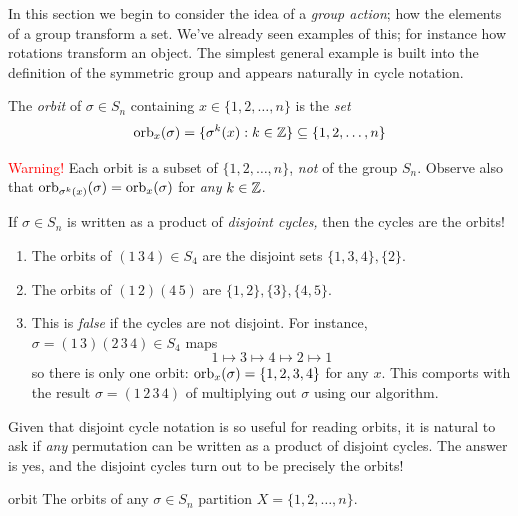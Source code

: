 In this section we begin to consider the idea of a \emph{group action}; how the elements of a group transform a set. We've already seen examples of this; for instance how rotations transform an object. The simplest general example is built into the definition of the symmetric group and appears naturally in cycle notation.

\begin{defn}{}{}
The \emph{orbit} of $\sigma\in S_n$ containing $x\in\{1,2,\ldots,n\}$ is the \emph{set}
\[\mathrm{orb}_x(\sigma)=\{\sigma^k(x):k\in\mathbb{Z}\}\subseteq\{1,2,\ldots,n\}\]
\end{defn}

\textcolor{red}{Warning!} Each orbit is a subset of $\{1,2,\ldots,n\}$, \emph{not} of the group $S_n$.\smallbreak
Observe also that $\mathrm{orb}_{\sigma^k(x)}(\sigma)=\mathrm{orb}_x(\sigma)$ for \emph{any} $k\in\mathbb{Z}$.


\begin{examples}{}{}
If $\sigma\in S_n$ is written as a product of \emph{disjoint cycles,} then the cycles are the orbits!
\begin{enumerate}
  \item The orbits of $(1\,3\,4)\in S_4$ are the disjoint sets $\{1,3,4\},\{2\}$.
  \item The orbits of $(1\,2)(4\,5)$ are $\{1,2\},\{3\},\{4,5\}$.
  \item This is \emph{false} if the cycles are not disjoint. For instance, $\sigma=(1\,3)(2\,3\,4)\in S_4$ maps
	\[1\mapsto 3\mapsto 4\mapsto 2\mapsto 1\]
	so there is only one orbit: $\mathrm{orb}_x(\sigma)=\{1,2,3,4\}$ for any $x$. This comports with the result $\sigma=(1\,2\,3\,4)$ of multiplying out $\sigma$ using our algorithm.
\end{enumerate}
\end{examples}

Given that disjoint cycle notation is so useful for reading orbits, it is natural to ask if \emph{any} permutation can be written as a product of disjoint cycles. The answer is yes, and  the disjoint cycles turn out to be precisely the orbits!


\begin{thm}{}{orbit}
The orbits of any $\sigma\in S_n$ partition $X=\{1,2,\ldots,n\}$.
\end{thm}

